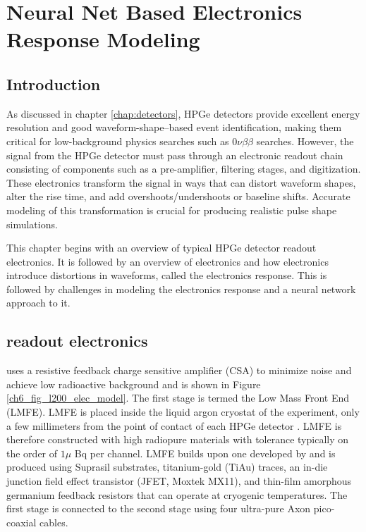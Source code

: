 \chapter{Neural Net Based Electronics Response Modeling}
\label{chap:elect_resp}

\section{Introduction}
As discussed in chapter \ref{chap:detectors}, HPGe detectors provide excellent energy resolution and good waveform-shape–based event identification, making them critical for low-background physics searches such as $0\nu\beta\beta$ searches. However, the signal from the HPGe detector must pass through an electronic readout chain consisting of components such as a pre-amplifier, filtering stages, and digitization. These electronics transform the signal in ways that can distort waveform shapes, alter the rise time, and add overshoots/undershoots or baseline shifts. Accurate modeling of this transformation is crucial for producing realistic pulse shape simulations.

This chapter begins with an overview of typical HPGe detector readout electronics. It is followed by an overview of {\Ltwo}  electronics and how electronics introduce distortions in waveforms, called the electronics response. This is followed by challenges in modeling the electronics response and a neural network approach to it.

\section{{\Ltwo} readout electronics}

{\Ltwo} uses a resistive feedback charge sensitive amplifier (CSA) to minimize noise and achieve low radioactive background and is shown in Figure \ref{ch6_fig_l200_elec_model}. The first stage is termed the Low Mass Front End (LMFE). LMFE is placed inside the liquid argon cryostat of the experiment, only a few millimeters from the point of contact of each HPGe detector \cite{Willers_2020}. LMFE is therefore constructed with high radiopure materials with tolerance typically on the order of $1\mu$ Bq per channel. LMFE builds upon one developed by {\MJD} and is produced using Suprasil substrates, titanium-gold (TiAu) traces, an in-die junction field effect transistor (JFET, Moxtek MX11), and thin-film amorphous germanium feedback resistors that can operate at cryogenic temperatures. The first stage is connected to the second stage using four ultra-pure Axon pico-coaxial cables.

